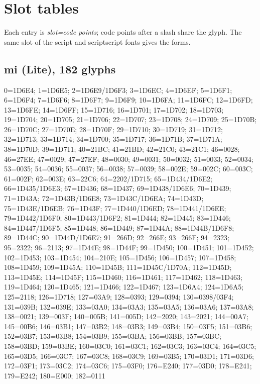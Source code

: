 
\section{Slot tables}\label{app:slots}

Each entry is \emph{slot=code points}; code points after a slash share the
glyph.  The same slot of the script and scriptscript fonts gives the
 forms.

\subsection*{mi (Lite), 182 glyphs}
\raggedright\small 0=1D6E4; 1=1D6E5; 2=1D6E9/1D6F3; 3=1D6EC; 4=1D6EF; 5=1D6F1;
6=1D6F4; 7=1D6F6; 8=1D6F7; 9=1D6F9; 10=1D6FA; 11=1D6FC; 12=1D6FD; 13=1D6FE;
14=1D6FF; 15=1D716; 16=1D701; 17=1D702; 18=1D703; 19=1D704; 20=1D705; 21=1D706;
22=1D707; 23=1D708; 24=1D709; 25=1D70B; 26=1D70C; 27=1D70E; 28=1D70F; 29=1D710;
30=1D719; 31=1D712; 32=1D713; 33=1D714; 34=1D700; 35=1D717; 36=1D71B; 37=1D71A;
38=1D70D; 39=1D711; 40=21BC; 41=21BD; 42=21C0; 43=21C1; 46=0028; 46=27EE;
47=0029; 47=27EF; 48=0030; 49=0031; 50=0032; 51=0033; 52=0034; 53=0035;
54=0036; 55=0037; 56=0038; 57=0039; 58=002E; 59=002C; 60=003C; 61=002F;
62=003E; 63=22C6; 64=2202/1D715; 65=1D434/1D6E2; 66=1D435/1D6E3; 67=1D436;
68=1D437; 69=1D438/1D6E6; 70=1D439; 71=1D43A; 72=1D43B/1D6E8; 73=1D43C/1D6EA;
74=1D43D; 75=1D43E/1D6EB; 76=1D43F; 77=1D440/1D6ED; 78=1D441/1D6EE;
79=1D442/1D6F0; 80=1D443/1D6F2; 81=1D444; 82=1D445; 83=1D446; 84=1D447/1D6F5;
85=1D448; 86=1D449; 87=1D44A; 88=1D44B/1D6F8; 89=1D44C; 90=1D44D/1D6E7;
91=266D; 92=266E; 93=266F; 94=2323; 95=2322; 96=2113; 97=1D44E; 98=1D44F;
99=1D450; 100=1D451; 101=1D452; 102=1D453; 103=1D454; 104=210E; 105=1D456;
106=1D457; 107=1D458; 108=1D459; 109=1D45A; 110=1D45B; 111=1D45C/1D70A;
112=1D45D; 113=1D45E; 114=1D45F; 115=1D460; 116=1D461; 117=1D462; 118=1D463;
119=1D464; 120=1D465; 121=1D466; 122=1D467; 123=1D6A4; 124=1D6A5; 125=2118;
126=1D718; 127=03A9; 128=0393; 129=0394; 130=0398/03F4; 131=039B; 132=039E;
133=03A0; 134=03A3; 135=03A5; 136=03A6; 137=03A8; 138=0021; 139=003F; 140=005B;
141=005D; 142=2020; 143=2021; 144=00A7; 145=00B6; 146=03B1; 147=03B2; 148=03B3;
149=03B4; 150=03F5; 151=03B6; 152=03B7; 153=03B8; 154=03B9; 155=03BA; 156=03BB;
157=03BC; 158=03BD; 159=03BE; 160=03C0; 161=03C1; 162=03C3; 163=03C4; 164=03C5;
165=03D5; 166=03C7; 167=03C8; 168=03C9; 169=03B5; 170=03D1; 171=03D6; 172=03F1;
173=03C2; 174=03C6; 175=03F0; 176=E240; 177=03D0; 178=E241; 179=E242; 180=E000;
182=0111\par

